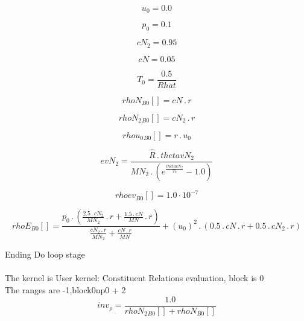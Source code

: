 \documentclass{article}
\begin{document}
\begin{dmath}u_{0} = 0.0\end{dmath}

\begin{dmath}p_{0} = 0.1\end{dmath}

\begin{dmath}cN_{2} = 0.95\end{dmath}

\begin{dmath}cN = 0.05\end{dmath}

\begin{dmath}T_{0} = \frac{0.5}{Rhat}\end{dmath}

\begin{dmath}{rhoN{_{B0}}}[{}] = cN \,.\, r\end{dmath}

\begin{dmath}{rhoN_{2}{_{B0}}}[{}] = cN_{2} \,.\, r\end{dmath}

\begin{dmath}{rhou_{0}{_{B0}}}[{}] = r \,.\, u_{0}\end{dmath}

\begin{dmath}evN_{2} = \frac{\hat{R} \,.\, thetavN_{2}}{MN_{2} \,.\, \left(e^{\frac{thetavN_{2}}{T_{0}}} - 1.0\right)}\end{dmath}

\begin{dmath}{rhoev{_{B0}}}[{}] = 1.0 \cdot 10^{-7}\end{dmath}

\begin{dmath}{rhoE{_{B0}}}[{}] = \frac{p_{0} \,.\, \left(\frac{2.5 \,.\, cN_{2}}{MN_{2}} \,.\, r + \frac{1.5 \,.\, cN}{MN} \,.\, r\right)}{\frac{cN_{2} \,.\, r}{MN_{2}} + \frac{cN \,.\, r}{MN}} + \left(u_{0} \right)^{2} \,.\, \left(0.5 \,.\, cN \,.\, 
r + 0.5 \,.\, cN_{2} \,.\, r\right)\end{dmath}

\noindent Ending Do loop stage\\
\\\noindent The kernel is User kernel: Constituent Relations evaluation, block is 0\\\noindent The ranges are -1,block0np0 + 2\\\begin{dmath}inv_{\rho} = \frac{1.0}{{rhoN_{2}{_{B0}}}[{}] + {rhoN{_{B0}}}[{}]}\end{dmath}
\end{document}

